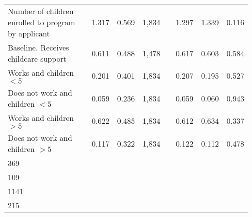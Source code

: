 \begin{tabular}{lccccccc}
Number of children enrolled to program by applicant & 1.317 & 0.569 &1,834 &&1.297 &1.339 &0.116 \\
Baseline. Receives childcare support & 0.611 & 0.488 &1,478 &&0.617 &0.603 &0.584 \\
Works and children $<5$ & 0.201 & 0.401 &1,834 &&0.207 &0.195 &0.527 \\
Does not work and children $<5$ & 0.059 & 0.236 &1,834 &&0.059 &0.060 &0.943 \\
Works and children $>5$ & 0.622 & 0.485 &1,834 &&0.612 &0.634 &0.337 \\
Does not work and children $>5$ & 0.117 & 0.322 &1,834 &&0.122 &0.112 &0.478 \\
369 \\
109 \\
1141 \\
215 \\
\hline \hline
\end{tabular}
